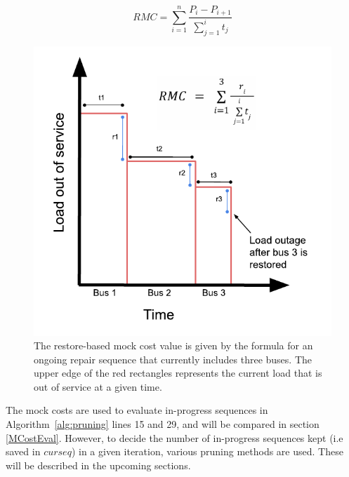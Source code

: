 \documentclass[12pt]{article}
\begin{document}
\begin{equation} 
   RMC=\sum_{i=1}^{n}\frac{P_i-P_{i+1}}{\sum_{j=1}^{i}t_j}
    \label{eq:rbmockcost}
\end{equation}
\begin{figure}[ht]
    \centering %
    \includegraphics[scale = 0.8]{RMCFigure.pdf}
    \caption[Restore based mock cost formula visualized]{The restore-based mock cost value is given by the formula for an ongoing repair sequence that currently includes three buses. The upper edge of the red rectangles represents the current load that is out of service at a given time.}
    \label{fig:RMCFigure}
\end{figure}

The mock costs are used to evaluate in-progress sequences in Algorithm~\ref{alg:pruning} lines 15 and 29, and will be compared in section \ref{MCostEval}. However, to decide the number of in-progress sequences kept (i.e saved in $curseq$) in a given iteration, various pruning methods are used. These will be described in the upcoming sections.
\end{document}
